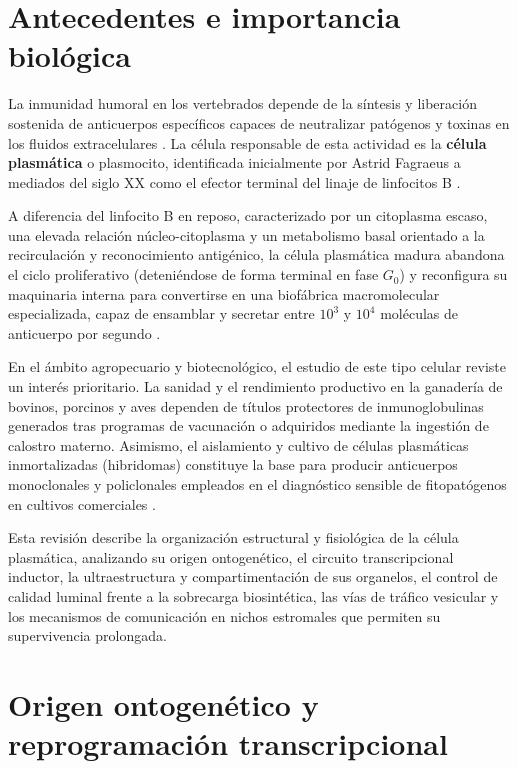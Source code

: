 \section{Antecedentes e importancia biológica}

La inmunidad humoral en los vertebrados depende de la síntesis y liberación sostenida de anticuerpos específicos capaces de neutralizar patógenos y toxinas en los fluidos extracelulares \parencite{alberts2022molecular,abbas2022cellular}. La célula responsable de esta actividad es la \textbf{célula plasmática} o plasmocito, identificada inicialmente por Astrid Fagraeus a mediados del siglo XX como el efector terminal del linaje de linfocitos B \parencite{nutt2015generation}.

A diferencia del linfocito B en reposo, caracterizado por un citoplasma escaso, una elevada relación núcleo-citoplasma y un metabolismo basal orientado a la recirculación y reconocimiento antigénico, la célula plasmática madura abandona el ciclo proliferativo (deteniéndose de forma terminal en fase $G_0$) y reconfigura su maquinaria interna para convertirse en una biofábrica macromolecular especializada, capaz de ensamblar y secretar entre $10^3$ y $10^4$ moléculas de anticuerpo por segundo \parencite{cenci2008progressive,shapiroshelef2005regulation}.

En el ámbito agropecuario y biotecnológico, el estudio de este tipo celular reviste un interés prioritario. La sanidad y el rendimiento productivo en la ganadería de bovinos, porcinos y aves dependen de títulos protectores de inmunoglobulinas generados tras programas de vacunación o adquiridos mediante la ingestión de calostro materno. Asimismo, el aislamiento y cultivo de células plasmáticas inmortalizadas (hibridomas) constituye la base para producir anticuerpos monoclonales y policlonales empleados en el diagnóstico sensible de fitopatógenos en cultivos comerciales \parencite{tellier2019plasma}.

Esta revisión describe la organización estructural y fisiológica de la célula plasmática, analizando su origen ontogenético, el circuito transcripcional inductor, la ultraestructura y compartimentación de sus organelos, el control de calidad luminal frente a la sobrecarga biosintética, las vías de tráfico vesicular y los mecanismos de comunicación en nichos estromales que permiten su supervivencia prolongada.

\section{Origen ontogenético y reprogramación transcripcional}


